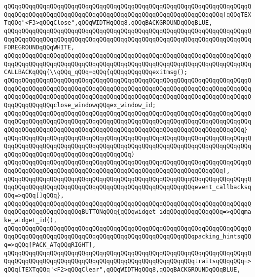 \verb|qQQqqQQqqQQqqQQqqQQqqQQqqQQqqQQqqQQqqQQqqQQqqQQqqQQqqQQqqQQqqQQqqQQqqQQqqQQqqQQqqQQqqQQqqQQqqQQqqQQqqQQqqQQqqQQqqQQqqQQqqQQqqQQqqQQq[qQQqTEXTqQQq"<F3>qQQqClose",qQQqWIDTHqQQq8,qQQqBACKGROUNDqQQqBLUE,|\newline
\verb|qQQqqQQqqQQqqQQqqQQqqQQqqQQqqQQqqQQqqQQqqQQqqQQqqQQqqQQqqQQqqQQqqQQqqQQqqQQqqQQqqQQqqQQqqQQqqQQqqQQqqQQqqQQqqQQqqQQqqQQqqQQqqQQqqQQqqQQqqQQqFOREGROUNDqQQqWHITE,|\newline
\verb|qQQqqQQqqQQqqQQqqQQqqQQqqQQqqQQqqQQqqQQqqQQqqQQqqQQqqQQqqQQqqQQqqQQqqQQqqQQqqQQqqQQqqQQqqQQqqQQqqQQqqQQqqQQqqQQqqQQqqQQqqQQqqQQqqQQqqQQqqQQqCALLBACKqQQq(\\qQQq_qQQq=qQQq{qQQqqQQqqQQqexitmsg();|\newline
\verb|qQQqqQQqqQQqqQQqqQQqqQQqqQQqqQQqqQQqqQQqqQQqqQQqqQQqqQQqqQQqqQQqqQQqqQQqqQQqqQQqqQQqqQQqqQQqqQQqqQQqqQQqqQQqqQQqqQQqqQQqqQQqqQQqqQQqqQQqqQQqqQQqqQQqqQQqqQQqqQQqqQQqqQQqqQQqqQQqqQQqqQQqqQQqqQQqqQQqqQQqqQQqqQQqqQQqqQQqqQQqqQQqclose_windowqQQqex_window_id;|\newline
\verb|qQQqqQQqqQQqqQQqqQQqqQQqqQQqqQQqqQQqqQQqqQQqqQQqqQQqqQQqqQQqqQQqqQQqqQQqqQQqqQQqqQQqqQQqqQQqqQQqqQQqqQQqqQQqqQQqqQQqqQQqqQQqqQQqqQQqqQQqqQQqqQQqqQQqqQQqqQQqqQQqqQQqqQQqqQQqqQQqqQQqqQQqqQQqqQQqqQQqqQQqqQQqqQQq}|\newline
\verb|qQQqqQQqqQQqqQQqqQQqqQQqqQQqqQQqqQQqqQQqqQQqqQQqqQQqqQQqqQQqqQQqqQQqqQQqqQQqqQQqqQQqqQQqqQQqqQQqqQQqqQQqqQQqqQQqqQQqqQQqqQQqqQQqqQQqqQQqqQQqqQQqqQQqqQQqqQQqqQQqqQQqqQQqqQQqqQQq)|\newline
\verb|qQQqqQQqqQQqqQQqqQQqqQQqqQQqqQQqqQQqqQQqqQQqqQQqqQQqqQQqqQQqqQQqqQQqqQQqqQQqqQQqqQQqqQQqqQQqqQQqqQQqqQQqqQQqqQQqqQQqqQQqqQQqqQQqqQQq],|\newline
\verb|qQQqqQQqqQQqqQQqqQQqqQQqqQQqqQQqqQQqqQQqqQQqqQQqqQQqqQQqqQQqqQQqqQQqqQQqqQQqqQQqqQQqqQQqqQQqqQQqqQQqqQQqqQQqqQQqqQQqqQQqqQQqevent_callbacksqQQq=>qQQq[]qQQq},|\newline
\verb|qQQqqQQqqQQqqQQqqQQqqQQqqQQqqQQqqQQqqQQqqQQqqQQqqQQqqQQqqQQqqQQqqQQqqQQqqQQqqQQqqQQqqQQqqQQqBUTTONqQQq{qQQqwidget_idqQQqqQQqqQQqqQQq=>qQQqmake_widget_id(),|\newline
\verb|qQQqqQQqqQQqqQQqqQQqqQQqqQQqqQQqqQQqqQQqqQQqqQQqqQQqqQQqqQQqqQQqqQQqqQQqqQQqqQQqqQQqqQQqqQQqqQQqqQQqqQQqqQQqqQQqqQQqqQQqqQQqpacking_hintsqQQq=>qQQq[PACK_ATqQQqRIGHT],|\newline
\verb|qQQqqQQqqQQqqQQqqQQqqQQqqQQqqQQqqQQqqQQqqQQqqQQqqQQqqQQqqQQqqQQqqQQqqQQqqQQqqQQqqQQqqQQqqQQqqQQqqQQqqQQqqQQqqQQqqQQqqQQqqQQqtraitsqQQqqQQq=>qQQq[TEXTqQQq"<F2>qQQqClear",qQQqWIDTHqQQq8,qQQqBACKGROUNDqQQqBLUE,|\newline
